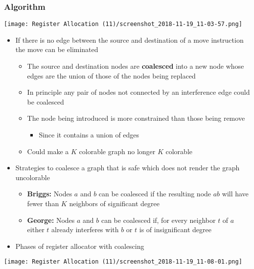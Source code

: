 \documentclass[11pt]{article}
\begin{document}
\subsubsection{Algorithm}
\label{sec:org0179ee4}
\begin{center}
\texttt{[image: Register Allocation (11)/screenshot\_2018-11-19\_11-03-57.png]}
\end{center}

\begin{itemize}
\item If there is no edge between the source and destination of a move instruction the move can be eliminated
\begin{itemize}
\item The source and destination nodes are \textbf{coalesced} into a new node whose edges are the union of those of the nodes being replaced
\item In principle any pair of nodes not connected by an interference edge could be coalesced
\item The node being introduced is more constrained than those being remove
\begin{itemize}
\item Since it contains a union of edges
\end{itemize}
\item Could make a \(K\) colorable graph no longer \(K\) colorable
\end{itemize}

\item Strategies to coalesce a graph that is safe which does not render the graph uncolorable 
\begin{itemize}
\item \textbf{Briggs:} Nodes \(a\) and \(b\) can be coalesced if the resulting node \(ab\) will have fewer than \(K\) neighbors of significant degree
\item \textbf{George:} Nodes \(a\) and \(b\) can be coalesced if, for every neighbor \(t\) of \(a\) either \(t\) already interferes with \(b\) or \(t\) is of insignificant degree
\end{itemize}

\item Phases of register allocator with coalescing
\end{itemize}
\begin{center}
\texttt{[image: Register Allocation (11)/screenshot\_2018-11-19\_11-08-01.png]}
\end{center}
\end{document}
